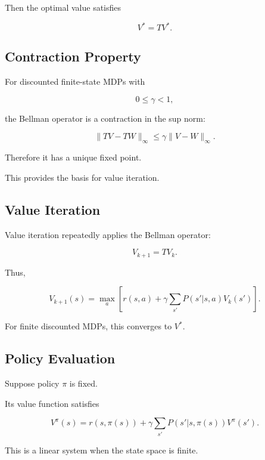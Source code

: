 Then the optimal value satisfies

\[
\boxed{
V^*=TV^*.
}
\]

\subsection{Contraction Property}
\label{subsec:bellman-contraction}

For discounted finite-state MDPs with

\[
0\leq\gamma<1,
\]

the Bellman operator is a contraction in the sup norm:

\[
\boxed{
\|TV-TW\|_\infty
\leq
\gamma
\|V-W\|_\infty.
}
\]

Therefore it has a unique fixed point.

This provides the basis for value iteration.

\subsection{Value Iteration}
\label{subsec:value-iteration}

Value iteration repeatedly applies the Bellman operator:

\[
\boxed{
V_{k+1}
=
TV_k.
}
\]

Thus,

\[
\boxed{
V_{k+1}(s)
=
\max_a
\left[
r(s,a)
+
\gamma
\sum_{s'}
P(s'|s,a)
V_k(s')
\right].
}
\]

For finite discounted MDPs, this converges to \(V^*\).

\subsection{Policy Evaluation}
\label{subsec:policy-evaluation}

Suppose policy \(\pi\) is fixed.

Its value function satisfies

\[
\boxed{
V^\pi(s)
=
r(s,\pi(s))
+
\gamma
\sum_{s'}
P
(
s'|s,\pi(s)
)
V^\pi(s').
}
\]

This is a linear system when the state space is finite.

